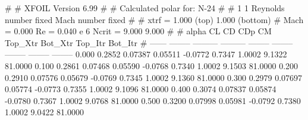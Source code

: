 #  
#       XFOIL         Version 6.99
#  
# Calculated polar for: N-24                                            
#  
# 1 1 Reynolds number fixed          Mach number fixed         
#  
# xtrf =   1.000 (top)        1.000 (bottom)  
# Mach =   0.000     Re =     0.040 e 6     Ncrit =   9.000  9.000
#  
#   alpha    CL        CD       CDp       CM     Top_Xtr  Bot_Xtr  Top_Itr  Bot_Itr
#  ------ -------- --------- --------- -------- -------- -------- -------- --------
   0.000   0.2852   0.07387   0.05511  -0.0772   0.7347   1.0002   9.1322  81.0000
   0.100   0.2861   0.07468   0.05590  -0.0768   0.7340   1.0002   9.1503  81.0000
   0.200   0.2910   0.07576   0.05679  -0.0769   0.7345   1.0002   9.1360  81.0000
   0.300   0.2979   0.07697   0.05774  -0.0773   0.7355   1.0002   9.1096  81.0000
   0.400   0.3074   0.07837   0.05874  -0.0780   0.7367   1.0002   9.0768  81.0000
   0.500   0.3200   0.07998   0.05981  -0.0792   0.7380   1.0002   9.0422  81.0000
